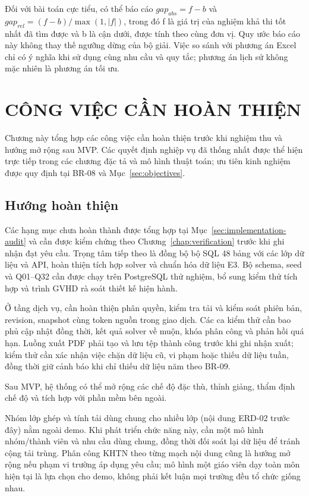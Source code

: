 \documentclass[12pt,a4paper]{report}
\begin{document}
Đối với bài toán cực tiểu, có thể báo cáo $gap_{abs}=f-b$ và $gap_{rel}=(f-b)/\max(1,|f|)$, trong đó f là giá trị của nghiệm khả thi tốt nhất đã tìm được và b là cận dưới, được tính theo cùng đơn vị. Quy ước báo cáo này không thay thế ngưỡng dừng của bộ giải. Việc so sánh với phương án Excel chỉ có ý nghĩa khi sử dụng cùng nhu cầu và quy tắc; phương án lịch sử không mặc nhiên là phương án tối ưu.

\chapter{CÔNG VIỆC CẦN HOÀN THIỆN}\label{chap:decisions}
Chương này tổng hợp các công việc cần hoàn thiện trước khi nghiệm thu và hướng mở rộng sau MVP. Các quyết định nghiệp vụ đã thống nhất được thể hiện trực tiếp trong các chương đặc tả và mô hình thuật toán; ưu tiên kinh nghiệm được quy định tại BR-08 và Mục~\ref{sec:objectives}.

\section{Hướng hoàn thiện}\label{sec:future-work}
Các hạng mục chưa hoàn thành được tổng hợp tại Mục~\ref{sec:implementation-audit} và cần được kiểm chứng theo Chương~\ref{chap:verification} trước khi ghi nhận đạt yêu cầu. Trọng tâm tiếp theo là đồng bộ bộ SQL 48 bảng với các lớp dữ liệu và API, hoàn thiện tích hợp solver và chuẩn hóa dữ liệu E3. Bộ schema, seed và Q01--Q32 cần được chạy trên PostgreSQL thử nghiệm, bổ sung kiểm thử tích hợp và trình GVHD rà soát thiết kế hiện hành.

Ở tầng dịch vụ, cần hoàn thiện phân quyền, kiểm tra tải và kiểm soát phiên bản, revision, snapshot cùng token nguồn trong giao dịch. Các ca kiểm thử cần bao phủ cập nhật đồng thời, kết quả solver về muộn, khóa phân công và phản hồi quá hạn. Luồng xuất PDF phải tạo và lưu tệp thành công trước khi ghi nhận xuất; kiểm thử cần xác nhận việc chặn dữ liệu cũ, vi phạm hoặc thiếu dữ liệu tuần, đồng thời giữ cảnh báo khi chỉ thiếu dữ liệu năm theo BR-09.

Sau MVP, hệ thống có thể mở rộng các chế độ đặc thù, thỉnh giảng, thẩm định chế độ và tích hợp với phần mềm bên ngoài.

Nhóm lớp ghép và tính tải dùng chung cho nhiều lớp (nội dung ERD-02 trước đây) nằm ngoài demo. Khi phát triển chức năng này, cần một mô hình nhóm/thành viên và nhu cầu dùng chung, đồng thời đối soát lại dữ liệu để tránh cộng tải trùng. Phân công KHTN theo từng mạch nội dung cũng là hướng mở rộng nếu phạm vi trường áp dụng yêu cầu; mô hình một giáo viên dạy toàn môn hiện tại là lựa chọn cho demo, không phải kết luận mọi trường đều tổ chức giống nhau.
\end{document}
